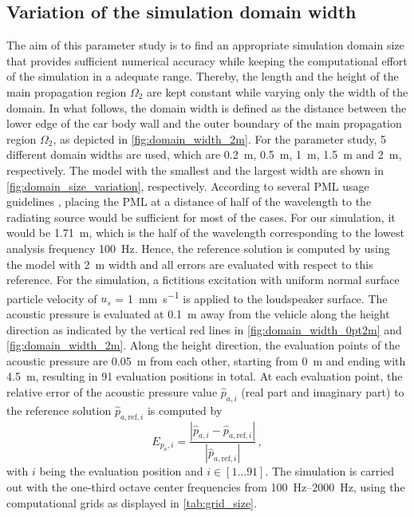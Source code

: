 {\subsection*{Variation of the simulation domain width}
The aim of this parameter study is to find an appropriate simulation domain size that provides sufficient numerical accuracy while keeping the computational effort of the simulation in a adequate range. 
Thereby, the length and the height of the main propagation region $\Omega_2$ are kept constant while varying only the width of the domain. 
In what follows, the domain width is defined as the distance between the lower edge of the car body wall and the outer boundary of the main propagation region $\Omega_2$, as depicted in \cref{fig:domain_width_2m}. For the parameter study, 5 different domain widths are used, which are \SI{0.2}{\meter}, \SI{0.5}{\meter}, \SI{1}{\meter}, \SI{1.5}{\meter} and \SI{2}{\meter}, respectively. The model with the smallest and the largest width are shown in \cref{fig:domain_size_variation}, respectively. 
According to several PML usage guidelines \cite{PML_3ds, PML_comsol, PML_quickwave}, placing the PML at a distance of half of the wavelength to the radiating source would be sufficient for most of the cases. 
For our simulation, it would be \SI{1.71}{\meter}, which is the half of the wavelength corresponding to the lowest analysis frequency \SI{100}{\hertz}.
Hence, the reference solution is computed by using the model with \SI{2}{\meter} width and all errors are evaluated with respect to this reference. For the simulation, a fictitious excitation with uniform normal surface particle velocity of $u_s$ = \SI{1}{\milli\meter\per\second} is applied to the loudspeaker surface. 
The acoustic pressure is evaluated at \SI{0.1}{\meter} away from the vehicle along the height direction as indicated by the vertical red lines in \cref{fig:domain_width_0pt2m} and \cref{fig:domain_width_2m}. Along the height direction, the evaluation points of the acoustic pressure are \SI{0.05}{\meter} from each other, starting from \SI{0}{\meter} and ending with \SI{4.5}{\meter}, resulting in 91 evaluation positions in total. At each evaluation point, the relative error of the acoustic pressure value $\hat{p}_{a,i}$ (real part and imaginary part) to the reference solution $\hat{p}_{a,\text{ref},i}$ is computed by
\begin{equation}
	E_{p_a,i} = \frac{\left| \hat{p}_{a,i} - \hat{p}_{a,\text{ref},i} \right|}{\left|\hat{p}_{a,\text{ref},i}\right|}\,,
\end{equation}
with $i$ being the evaluation position and $i \in \left[1\dots91\right]$. The simulation is carried out with the one-third octave center frequencies from \SIrange{100}{2000}{\hertz}, using the computational grids as displayed in \cref{tab:grid_size}.

}
